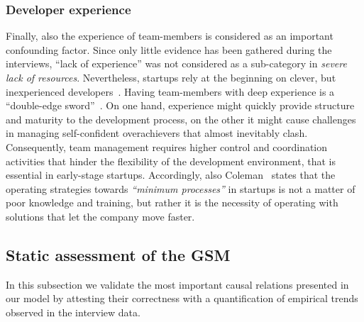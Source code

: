 \documentclass[10pt,journal,letterpaper,compsoc]{IEEEtran}
\begin{document}
\subsubsection{Developer experience} 
Finally, also the experience of team-members is considered as an important 
confounding factor. Since only little evidence has been gathered during the 
interviews, ``lack of experience'' was not considered as a sub-category in 
\textit{severe lack of resources}.
Nevertheless, startups rely at the beginning on clever, but inexperienced
developers~\cite{Crowne2002}. Having team-members with deep experience is a
``double-edge sword''~\cite{Yoffie1999}. On one hand, experience might quickly
provide structure and maturity to the development process, on the other it
might cause challenges in managing self-confident overachievers that almost
inevitably clash. Consequently, team management requires higher control and
coordination activities that hinder the flexibility of the development 
environment, that is essential in early-stage startups.
Accordingly, also Coleman~\cite{Coleman2007, Coleman2008a,Coleman2008} states
that the operating strategies towards \textit{``minimum processes''} in
startups is not a matter of poor knowledge and training, but rather it is the
necessity of operating with solutions that let the company move faster.


\subsection{Static assessment of the GSM} \label{sect:theory:validation:stats}

In this subsection we validate the most important causal relations presented in 
our model by attesting their correctness with a quantification of empirical 
trends observed in the interview data. 
\end{document}
